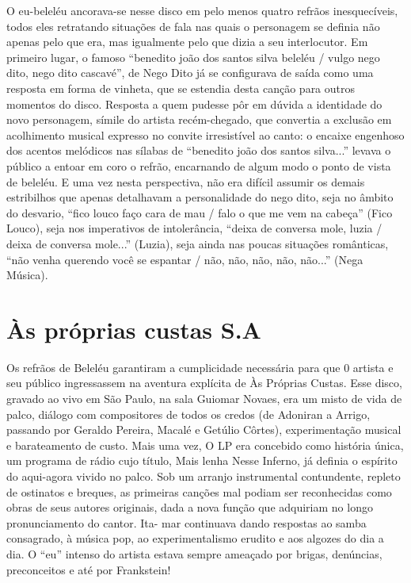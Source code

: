 O eu-beleléu ancorava-se nesse disco em pelo menos quatro refrãos
inesquecíveis, todos eles retratando situações de fala nas quais o
personagem se definia não apenas pelo que era, mas igualmente pelo que
dizia a seu interlocutor. Em primeiro lugar, o famoso ``benedito joão
dos santos silva beleléu / vulgo nego dito, nego dito cascavé'', de Nego
Dito já se configurava de saída \textbar{} como uma resposta em forma de
vinheta, que se estendia desta canção para outros momentos do disco.
Resposta a quem pudesse pôr em dúvida a identidade do novo personagem,
símile do artista recém-chegado, que convertia a exclusão em acolhimento
musical expresso no convite irresistível ao canto: o encaixe engenhoso
dos acentos melódicos nas sílabas de ``benedito joão dos santos
silva...'' levava o público a entoar em coro o refrão, encarnando de
algum modo o ponto de vista de beleléu. E uma vez nesta perspectiva, não
era difícil assumir os demais estribilhos que apenas detalhavam a
personalidade do nego dito, seja no âmbito do desvario, ``fico louco
faço cara de mau / falo o que me vem na cabeça'' (Fico Louco), seja nos
imperativos de intolerância, \textbar{} ``deixa de conversa mole, luzia
/ deixa de conversa mole...'' (Luzia), seja ainda nas poucas situações
românticas, ``não venha querendo você se espantar / não, não, não, não,
não...'' (Nega Música).

\section{Às próprias custas S.A}

Os refrãos de Beleléu garantiram a cumplicidade necessária para que 0
artista e seu público ingressassem na aventura explícita de Às Próprias
Custas. Esse disco, gravado ao vivo em São Paulo, na sala Guiomar
Novaes, era um misto de vida de palco, diálogo com compositores de todos
os credos (de Adoniran a Arrigo, passando por Geraldo Pereira, Macalé e
Getúlio Côrtes), experimentação musical e barateamento de custo. Mais
uma vez, O LP era concebido como história única, um programa de rádio
cujo título, Mais lenha Nesse Inferno, já definia o espírito do
aqui-agora vivido no palco. Sob um arranjo instrumental contundente,
repleto de ostinatos e breques, as primeiras canções mal podiam ser
reconhecidas como obras de seus autores originais, dada a nova função
que adquiriam no longo pronunciamento do cantor. Ita- mar continuava
dando respostas ao samba consagrado, à música pop, ao experimentalismo
erudito e aos algozes do dia a dia. O ``eu'' intenso do artista estava
sempre ameaçado por brigas, denúncias, preconceitos e até por
Frankstein!

